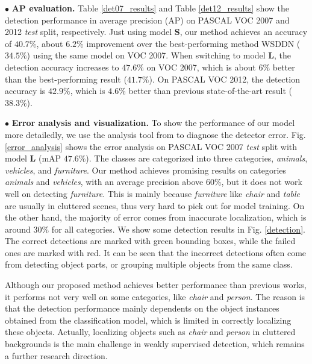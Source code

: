 \documentclass[10pt,twocolumn,letterpaper]{article}
\begin{document}
\noindent $\bullet$ \textbf{AP evaluation.} Table \ref{det07_results} and Table \ref{det12_results} show the detection performance in average precision (AP) on PASCAL VOC 2007 and 2012 \emph{test} split, respectively. Just using model \textbf{S}, our method achieves an accuracy of $40.7\%$, \ie about $6.2\%$ improvement over the best-performing method WSDDN \cite{Bilen_2016_CVPR} ($34.5\%$) using the same model on VOC 2007. When switching to model \textbf{L}, the detection accuracy increases to $47.6\%$ on VOC 2007, which is about $6\%$ better than the best-performing result \cite{jie2017deep} ($41.7\%$). On PASCAL VOC 2012, the detection accuracy is $42.9\%$, which is $4.6\%$  better than previous state-of-the-art result \cite{jie2017deep} ($38.3\%$).

\noindent $\bullet$ \textbf{Error analysis and visualization.}  To show the performance of our model more detailedly, we use the analysis tool from \cite{hoiem2012diagnosing} to diagnose the detector error. Fig. \ref{error_analysis} shows the error analysis on PASCAL VOC 2007 \emph{test} split with model $\textbf{L}$ (mAP $47.6\%$). The classes are categorized into three categories, \emph{animals}, \emph{vehicles}, and \emph{furniture}. Our method achieves promising results on categories \emph{animals} and \emph{vehicles}, with an average precision above $60\%$, but it does not work well on detecting \emph{furniture}. This is mainly because \emph{furniture} like \emph{chair} and \emph{table} are usually in cluttered scenes, thus very hard to pick out for model training. On the other hand, the majority of error comes from inaccurate localization, which is around $30\%$ for all categories. We show some detection results in Fig. \ref{detection}. The correct detections are marked with green bounding boxes, while the failed ones are marked with red. It can be seen that the incorrect detections often come from detecting object parts, or grouping multiple objects from the same class.

Although our proposed method achieves better performance than previous works, it performs not very well on some categories, like \emph{chair} and \emph{person}. The reason is that the detection performance mainly dependents on the object instances obtained from the classification model, which is limited in correctly localizing these objects. Actually, localizing objects such as \emph{chair} and \emph{person} in cluttered backgrounds is the main challenge in weakly supervised detection, which remains  a further research direction.
\end{document}
